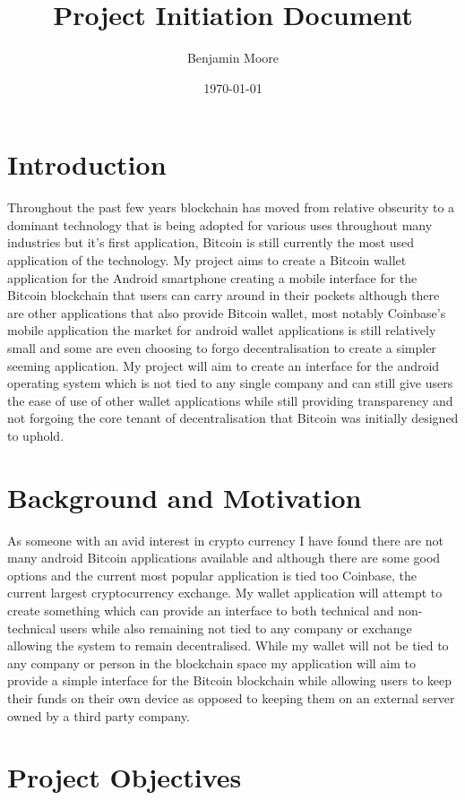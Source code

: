 \documentclass[11pt]{article}
\author{Benjamin Moore}
\date{\today}
\title{Project Initiation Document}
\begin{document}
\maketitle

\section{Introduction}
\label{sec:org87c92f7}
Throughout the past few years blockchain has moved from relative obscurity to 
a dominant technology that is being adopted for various uses throughout many industries
but it's first application, Bitcoin is still currently the most used application of the
technology. My project aims to create a Bitcoin wallet application for the Android smartphone
creating a mobile interface for the Bitcoin blockchain that users can carry around in their pockets
although there are other applications that also provide Bitcoin wallet, most notably Coinbase's mobile
application the market for android wallet applications is still relatively small and some are even choosing 
to forgo decentralisation to create a simpler seeming application. My project will aim to create an interface 
for the android operating system which is not tied to any single company and can still give users the ease of use 
of other wallet applications while still providing transparency and not forgoing the core tenant of decentralisation
that Bitcoin was initially designed to uphold.


\section{Background and Motivation}
\label{sec:orgdbdb4f8}
As someone with an avid interest in crypto currency I have found there are not many android Bitcoin applications available 
and although there are some good options and the current most popular application is tied too Coinbase, the current largest 
cryptocurrency exchange. My wallet application will attempt to create something which can provide an interface to both technical 
and non-technical users while also remaining not tied to any company or exchange allowing the system to remain decentralised. 
While my wallet will not be tied to any company or person in the blockchain space my application will aim to provide a simple 
interface for the Bitcoin blockchain while allowing users to keep their funds on their own device as opposed to keeping them 
on an external server owned by a third party company.


\section{Project Objectives}
\label{sec:orgba6285c}
\end{document}
